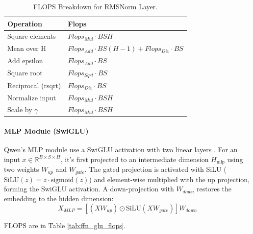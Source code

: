 \documentclass{article}
\begin{document}
\begin{table}[!th]
\renewcommand{\arraystretch}{1.4} \centering \setlength{\tabcolsep}{8pt}
\begin{tabular}{@{}ll@{}} %
    \toprule \textbf{Operation} & \textbf{Flops} \\ \midrule
    Square elements & $Flops_{Mul} \cdot BSH$ \\
    Mean over H & $Flops_{Add} \cdot BS(H - 1) + Flops_{Div} \cdot BS$ \\
    Add epsilon & $Flops_{Add} \cdot BS$ \\
    Square root & $Flops_{Sqrt} \cdot BS$ \\
    Reciprocal (rsqrt) & $Flops_{Div} \cdot BS$ \\
    Normalize input & $Flops_{Mul} \cdot BSH$ \\
    Scale by $\gamma$ & $Flops_{Mul} \cdot BSH$ \\
    \bottomrule
\end{tabular}
\caption{FLOPS Breakdown for RMSNorm Layer.} \label{tab:rmsnorm_flops}
\end{table}

\paragraph{MLP Module (SwiGLU)}
Qwen's MLP module use a SwiGLU activation with two linear layers \cite{shazeer2020gluvariantsimprovetransformer}. For an input $x \in \mathbb{R}^{B \times S \times H}$, it's first projected to an intermediate dimension $H_{\text{mlp}}$ using two weights $W_{up}$ and $W_{gate}$. The gated projection is activated with SiLU ($\text{SiLU}(z)=z\cdot\text{sigmoid}(z)$) and element-wise multiplied with the up projection, forming the SwiGLU activation. A down-projection with $W_{down}$ restores the embedding to the hidden dimension:
\begin{equation}
    X_{MLP} = \left[ (X W_{up}) \odot \text{SiLU}(X W_{gate}) \right] W_{down}
\end{equation}

FLOPS are in Table \ref{tab:ffn_glu_flops}.
\end{document}
